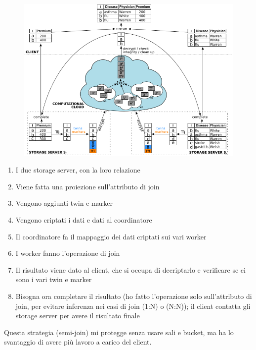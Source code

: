 \documentclass{report}
\begin{document}
\begin{figure}[H]
    \centering
    \includegraphics[width=1\linewidth]{images/overall-exe.png}
\end{figure}

\begin{enumerate}
    \item I due storage server, con la loro relazione
    \item Viene fatta una proiezione sull'attributo di join 
    \item Vengono aggiunti twin e marker 
    \item Vengono criptati i dati e dati al coordinatore 
    \item Il coordinatore fa il mappaggio dei dati criptati sui vari worker 
    \item I worker fanno l'operazione di join 
    \item Il risultato viene dato al client, che si occupa di decriptarlo e verificare 
    se ci sono i vari twin e marker 
    \item Bisogna ora completare il risultato (ho fatto l'operazione solo sull'attributo di 
    join, per evitare inferenza nei casi di join (1:N) o (N:N)); il client contatta gli storage 
    server per avere il risultato finale 
\end{enumerate}

\noindent Questa strategia (semi-join) mi protegge senza usare sali e bucket, ma ha lo svantaggio di avere 
più lavoro a carico del client.
\end{document}
